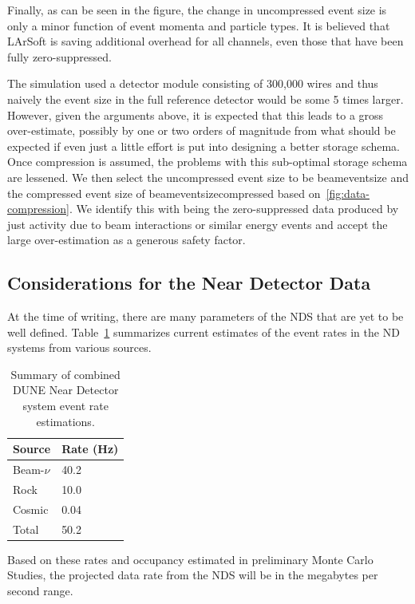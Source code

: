 Finally, as can be seen in the figure, the change in uncompressed
event size is only a minor function of event momenta and particle types.
It is believed that LArSoft is saving additional overhead for all
channels, even those that have been fully zero-suppressed.

The simulation used a detector module consisting of 300,000 wires and thus naively the event
size in the full reference detector would be some 5 times larger.
However, given the arguments above, it is expected that this leads to
a gross over-estimate, possibly by one or two orders of magnitude from
what should be expected if even just a little effort is put into
designing a better storage schema.
Once compression is assumed, the problems with this sub-optimal
storage schema are lessened.
We then select the uncompressed event size to be beameventsize and
the compressed event size of beameventsizecompressed based
on~\ref{fig:data-compression}.
We identify this with being the zero-suppressed data produced by just
activity due to beam interactions or similar energy events and accept
the large over-estimation as a generous safety factor.

\subsection{Considerations for the Near Detector Data}
At the time of writing, there are many parameters of the NDS that are yet to be well defined.
Table~\ref{tab:nds-event-rates} summarizes current estimates of the event rates
in the ND systems from various sources.

\begin{table}[ht!]
\centering
\begin{tabular}{| p{1in} | p{1in} |}		\hline		
\textbf{Source} & \textbf{Rate} (Hz)\\ \hline
Beam-$\nu$ & 40.2 \\ \hline
Rock & 10.0 \\ \hline
Cosmic & 0.04 \\ \hline
Total & 50.2 \\ \hline
\end{tabular}
\caption{Summary of combined DUNE Near Detector system event rate estimations.}
\label{tab:nds-event-rates}
\end{table}

Based on these rates and occupancy estimated in preliminary Monte Carlo Studies, the projected
data rate from the NDS will be in the megabytes per second range.